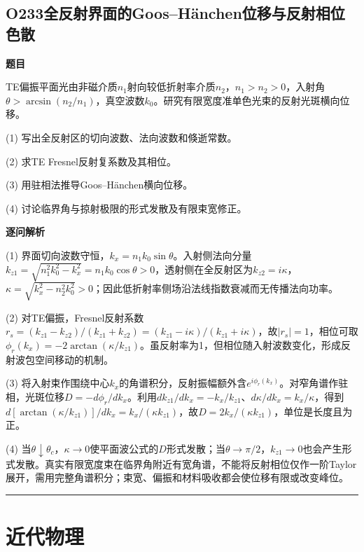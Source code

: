 \documentclass[UTF8,a4paper,11pt,oneside,openany]{ctexbook}
\begin{document}
\section*{O233\quad 全反射界面的Goos–Hänchen位移与反射相位色散}
\textbf{题目}\par
TE偏振平面光由非磁介质$n_1$射向较低折射率介质$n_2$，$n_1>n_2>0$，入射角$\theta>\arcsin(n_2/n_1)$，真空波数$k_0$。研究有限宽度准单色光束的反射光斑横向位移。
\par\smallskip\noindent (1) 写出全反射区的切向波数、法向波数和倏逝常数。
\par\smallskip\noindent (2) 求TE Fresnel反射复系数及其相位。
\par\smallskip\noindent (3) 用驻相法推导Goos–Hänchen横向位移。
\par\smallskip\noindent (4) 讨论临界角与掠射极限的形式发散及有限束宽修正。
\par\medskip\textbf{逐问解析}\par
\par\smallskip\noindent (1) 界面切向波数守恒，$k_x=n_1k_0\sin\theta$。入射侧法向分量$k_{z1}=\sqrt{n_1^2k_0^2-k_x^2}=n_1k_0\cos\theta>0$，透射侧在全反射区为$k_{z2}=i\kappa$，$\kappa=\sqrt{k_x^2-n_2^2k_0^2}>0$；因此低折射率侧场沿法线指数衰减而无传播法向功率。
\par\smallskip\noindent (2) 对TE偏振，Fresnel反射系数$r_s=(k_{z1}-k_{z2})/(k_{z1}+k_{z2})=(k_{z1}-i\kappa)/(k_{z1}+i\kappa)$，故$|r_s|=1$，相位可取$\phi_r(k_x)=-2\arctan(\kappa/k_{z1})$。虽反射率为1，但相位随入射波数变化，形成反射波包空间移动的机制。
\par\smallskip\noindent (3) 将入射束作围绕中心$k_x$的角谱积分，反射振幅额外含$e^{i\phi_r(k_x)}$。对窄角谱作驻相，光斑位移$D=-d\phi_r/dk_x$。利用$dk_{z1}/dk_x=-k_x/k_{z1}$、$d\kappa/dk_x=k_x/\kappa$，得到$d[\arctan(\kappa/k_{z1})]/dk_x=k_x/(\kappa k_{z1})$，故$D=2k_x/(\kappa k_{z1})$，单位是长度且为正。
\par\smallskip\noindent (4) 当$\theta\downarrow\theta_c$，$\kappa\to0$使平面波公式的$D$形式发散；当$\theta\to\pi/2$，$k_{z1}\to0$也会产生形式发散。真实有限宽度束在临界角附近有宽角谱，不能将反射相位仅作一阶Taylor展开，需用完整角谱积分；束宽、偏振和材料吸收都会使位移有限或改变峰位。
\par\medskip\hrule\medskip
\chapter{近代物理}
\end{document}
